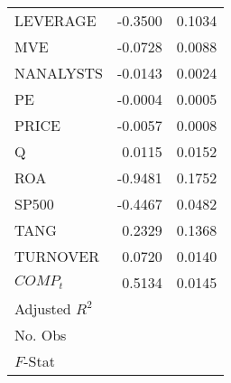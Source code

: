 \begin{table}[H]
\begin{tabular}{lrr}
  LEVERAGE & -0.3500 & 0.1034 \\ 
  MVE & -0.0728 & 0.0088 \\ 
  NANALYSTS & -0.0143 & 0.0024 \\ 
  PE & -0.0004 & 0.0005 \\ 
  PRICE & -0.0057 & 0.0008 \\ 
  Q & 0.0115 & 0.0152 \\ 
  ROA & -0.9481 & 0.1752 \\ 
  SP500 & -0.4467 & 0.0482 \\ 
  TANG & 0.2329 & 0.1368 \\ 
  TURNOVER & 0.0720 & 0.0140 \\ 
  $COMP_t$ & 0.5134 & 0.0145 \\ 
   \hline
Adjusted $R^2$ \\
No. Obs \\
$F$-Stat
\end{tabular}
\end{table}
